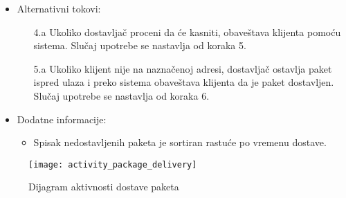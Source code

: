 \begin{itemize}
		\item{Alternativni tokovi:}
			\begin{enumerate}
				\item[4.a] Ukoliko dostavljač proceni da će kasniti, obaveštava klijenta pomoću sistema. Slučaj upotrebe se nastavlja od koraka 5.
				\item[5.a] Ukoliko klijent nije na naznačenoj adresi, dostavljač ostavlja paket ispred ulaza i preko sistema obaveštava klijenta da je paket dostavljen. Slučaj upotrebe se nastavlja od koraka 6.
			\end{enumerate}
		\item{Dodatne informacije:}
			\begin{itemize}
				\item{Spisak nedostavljenih paketa je sortiran rastuće po vremenu dostave.}
			\end{itemize}
	\end{itemize}
	
\begin{figure}[H]
	\begin{center}
		\texttt{[image: activity\_package\_delivery]}
	\end{center}
	\caption{Dijagram aktivnosti dostave paketa}
\end{figure}	
